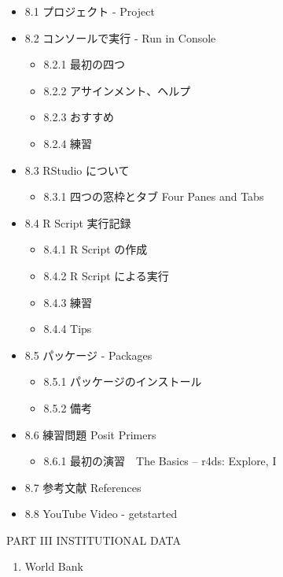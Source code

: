\documentclass[
  xelatex, ja=standard]{bxjsbook}
\providecommand{\tightlist}{%
  \setlength{\itemsep}{0pt}\setlength{\parskip}{0pt}}
\theoremstyle{definition}
\theoremstyle{definition}
\theoremstyle{definition}
\theoremstyle{definition}
\theoremstyle{remark}
\begin{document}
\begin{itemize}
\tightlist
\item
  8.1 プロジェクト - Project
\item
  8.2 コンソールで実行 - Run in Console

  \begin{itemize}
  \tightlist
  \item
    8.2.1 最初の四つ
  \item
    8.2.2 アサインメント、ヘルプ
  \item
    8.2.3 おすすめ
  \item
    8.2.4 練習
  \end{itemize}
\item
  8.3 RStudio について

  \begin{itemize}
  \tightlist
  \item
    8.3.1 四つの窓枠とタブ Four Panes and Tabs
  \end{itemize}
\item
  8.4 R Script 実行記録

  \begin{itemize}
  \tightlist
  \item
    8.4.1 R Script の作成
  \item
    8.4.2 R Script による実行
  \item
    8.4.3 練習
  \item
    8.4.4 Tips
  \end{itemize}
\item
  8.5 パッケージ - Packages

  \begin{itemize}
  \tightlist
  \item
    8.5.1 パッケージのインストール
  \item
    8.5.2 備考
  \end{itemize}
\item
  8.6 練習問題 Posit Primers

  \begin{itemize}
  \tightlist
  \item
    8.6.1 最初の演習　The Basics -- r4ds: Explore, I
  \end{itemize}
\item
  8.7 参考文献 References
\item
  8.8 YouTube Video - getstarted
\end{itemize}

PART III INSTITUTIONAL DATA

\begin{enumerate}
\def\labelenumi{\arabic{enumi}.}
\setcounter{enumi}{30}
\tightlist
\item
  World Bank
\end{enumerate}
\end{document}
